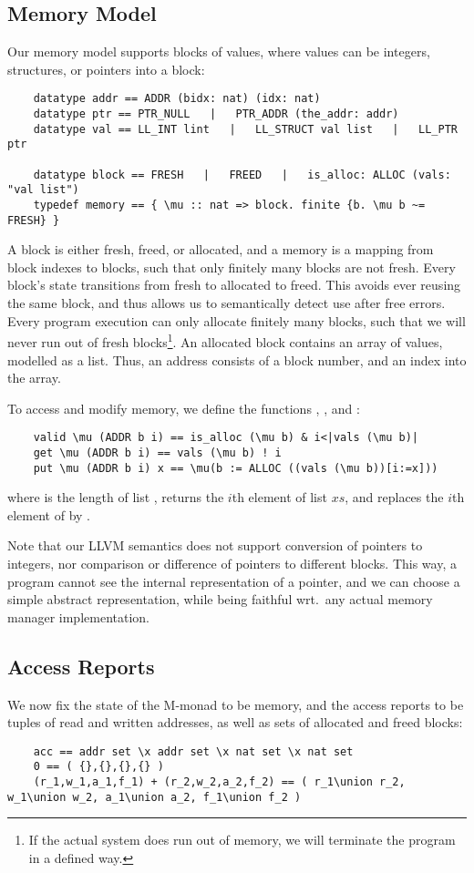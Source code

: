 \documentclass[sn-mathphys,Numbered]{sn-jnl}
\theoremstyle{thmstyleone}%
\theoremstyle{definition}%
\theoremstyle{thmstylethree}%
\begin{document}
  \subsection{Memory Model}
  Our memory model supports blocks of values, where values can be integers, structures, or pointers into a block:
  \begin{lstlisting}
    datatype addr == ADDR (bidx: nat) (idx: nat)
    datatype ptr == PTR_NULL   |   PTR_ADDR (the_addr: addr)
    datatype val == LL_INT lint   |   LL_STRUCT val list   |   LL_PTR ptr

    datatype block == FRESH   |   FREED   |   is_alloc: ALLOC (vals: "val list")
    typedef memory == { \mu :: nat => block. finite {b. \mu b ~= FRESH} }
  \end{lstlisting}
  A block is either fresh, freed, or allocated, and a memory is a mapping from block indexes to blocks,
  such that only finitely many blocks are not fresh. Every block's state transitions from fresh to
  allocated to freed. This avoids ever reusing the same block, and thus allows us to semantically detect use after free errors.
  Every program execution can only allocate finitely many blocks,
  such that we will never run out of fresh blocks\footnote{If the actual system does run out of memory, we will terminate the program in a defined way.}.
  An allocated block contains an array of values, modelled as a list. Thus, an address consists of a block number, and an index into the array.

  To access and modify memory, we define the functions , , and :
  \begin{lstlisting}
    valid \mu (ADDR b i) == is_alloc (\mu b) & i<|vals (\mu b)|
    get \mu (ADDR b i) == vals (\mu b) ! i
    put \mu (ADDR b i) x == \mu(b := ALLOC ((vals (\mu b))[i:=x]))
  \end{lstlisting}
  where  is the length of list ,  returns the \is$i$th element of list \is$xs$,
  and  replaces the \is$i$th element of  by .

  Note that our LLVM semantics does not support conversion of pointers to integers, nor comparison
  or difference of pointers to different blocks. This way, a program cannot see the internal representation of a pointer,
  and we can choose a simple abstract representation, while being
  faithful wrt.\ any actual memory manager implementation.

  \subsection{Access Reports}
  We now fix the state of the M-monad to be memory, and the access reports to be tuples  of
  read and written addresses, as well as sets of allocated and freed blocks:
  \begin{lstlisting}
    acc == addr set \x addr set \x nat set \x nat set
    0 == ( {},{},{},{} )
    (r_1,w_1,a_1,f_1) + (r_2,w_2,a_2,f_2) == ( r_1\union r_2, w_1\union w_2, a_1\union a_2, f_1\union f_2 )
  \end{lstlisting}
\end{document}
